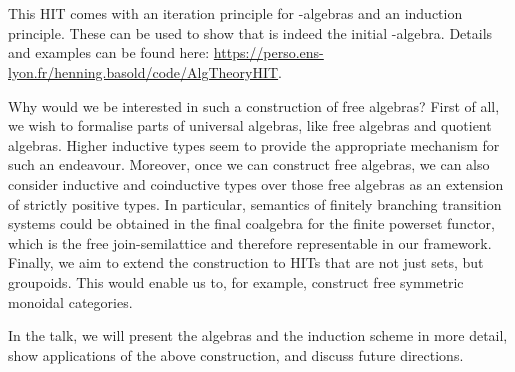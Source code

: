 \documentclass{easychair}
\begin{document}
\begin{code}
\AgdaSpace{}%
\AgdaSymbol{)}\AgdaSpace{}%
\AgdaSpace{}%
\AgdaSpace{}%
\<%
\\
\>[6]%
\>[13]\AgdaSymbol{:}\AgdaSpace{}%
\AgdaSpace{}%
\AgdaSymbol{\{}\AgdaSpace{}%
\AgdaSymbol{\}}\AgdaSpace{}%
\AgdaSpace{}%
\AgdaSpace{}%
\AgdaSpace{}%
\AgdaSpace{}%
\AgdaSpace{}%
\AgdaSpace{}%
\AgdaSpace{}%
\AgdaOperator{\AgdaDatatype{==}}\AgdaSpace{}%
\AgdaSpace{}%
\<%
\\
%
\>[6]%
\>[13]\AgdaSymbol{:}\AgdaSpace{}%
\AgdaSpace{}%
\AgdaSymbol{(}\AgdaSpace{}%
\AgdaSymbol{)}\<%
\end{code}

This HIT comes with an iteration principle for -algebras and an
induction principle.
These can be used to show that  is indeed the initial
-algebra.
Details and examples can be found here:
\url{https://perso.ens-lyon.fr/henning.basold/code/AlgTheoryHIT}.

Why would we be interested in such a construction of free algebras?
First of all, we wish to formalise parts of universal algebras, like free
algebras and quotient algebras.
Higher inductive types seem to provide the appropriate mechanism for such
an endeavour.
Moreover, once we can construct free algebras, we can also consider inductive
and coinductive types over those free algebras as an extension of strictly
positive types.
In particular, semantics of finitely branching transition systems could be
obtained in the final coalgebra for the finite powerset functor, which is
the free join-semilattice and therefore representable in our framework.
Finally, we aim to extend the construction to HITs that are not just sets, but
groupoids.
This would enable us to, for example, construct free symmetric monoidal
categories.

In the talk, we will present the algebras and the induction scheme in more
detail, show applications of the above construction, and discuss future
directions.


%
%
%


\end{document}
